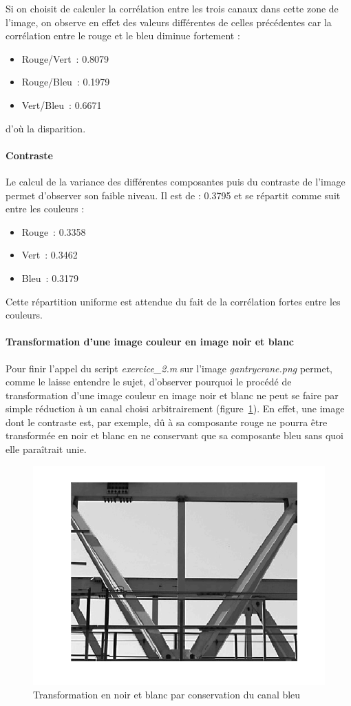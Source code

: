 \documentclass{article}
\begin{document}
Si on choisit de calculer la corrélation entre les trois canaux dans cette zone de l'image, on observe en effet des valeurs différentes de celles précédentes car la corrélation entre le rouge et le bleu diminue fortement :
\begin{itemize}
    \item Rouge/Vert~: 0.8079
    \item Rouge/Bleu~: 0.1979
    \item Vert/Bleu~: 0.6671
\end{itemize}

d'où la disparition.

\paragraph{Contraste}
Le calcul de la variance des différentes composantes puis du contraste de l'image permet d'observer son faible niveau. Il est de : 0.3795 et se répartit comme suit entre les couleurs :
\begin{itemize}
    \item Rouge~: 0.3358
    \item Vert~: 0.3462
    \item Bleu~: 0.3179
\end{itemize}
Cette répartition uniforme est attendue du fait de la corrélation fortes entre les couleurs.

\paragraph{Transformation d'une image couleur en image noir et blanc}
Pour finir l'appel du script \emph{exercice\_2.m} sur l'image \emph{gantrycrane.png} permet, comme le laisse entendre le sujet, d'observer pourquoi le procédé de transformation d'une image couleur en image noir et blanc ne peut se faire par simple réduction à un canal choisi arbitrairement (figure~\ref{transmission_canal_bleu}). En effet, une image dont le contraste est, par exemple, dû à sa composante rouge ne pourra être transformée en noir et blanc en ne conservant que sa composante bleu sans quoi elle paraîtrait unie.
\begin{figure}[!ht]
    \begin{center}
        \includegraphics[width=0.6\linewidth]{images/1-gantrycrane_b.png}
        \caption{Transformation en noir et blanc par conservation du canal bleu}
        \label{transmission_canal_bleu}
    \end{center}
\end{figure}
\end{document}
